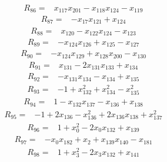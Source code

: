 {\begin{align*}
\end{align*}
\begin{align*}
R_{86} ={}& x_{117} x_{201} - x_{118} x_{124} - x_{119}
\end{align*}
\begin{align*}
R_{87} ={}& -x_{17} x_{121} + x_{124}
\end{align*}
\begin{align*}
R_{88} ={}& x_{120} - x_{122} x_{124} - x_{123}
\end{align*}
\begin{align*}
R_{89} ={}& -x_{124} x_{126} + x_{125} - x_{127}
\end{align*}
\begin{align*}
R_{90} ={}& -x_{124} x_{129} + x_{128} x_{200} - x_{130}
\end{align*}
\begin{align*}
R_{91} ={}& x_{131} - 2x_{131} x_{133} + x_{134}
\end{align*}
\begin{align*}
R_{92} ={}& -x_{131} x_{134} - x_{134} + x_{135}
\end{align*}
\begin{align*}
R_{93} ={}& -1 + x_{132}^{2} + x_{134}^{2} - x_{135}^{2}
\end{align*}
\begin{align*}
R_{94} ={}& 1 - x_{132} x_{137} - x_{136} + x_{138}
\end{align*}
\begin{align*}
R_{95} ={}& -1 + 2x_{136} - x_{136}^{2} + 2x_{136} x_{138} + x_{137}^{2}
\end{align*}
\begin{align*}
R_{96} ={}& 1 + x_{0}^{2} - 2x_{0} x_{132} + x_{139}
\end{align*}
\begin{align*}
R_{97} ={}& -x_{0} x_{182} + x_{2} + x_{139} x_{140} - x_{181}
\end{align*}
\begin{align*}
R_{98} ={}& 1 + x_{3}^{2} - 2x_{3} x_{132} + x_{141}
\end{align*}
}

